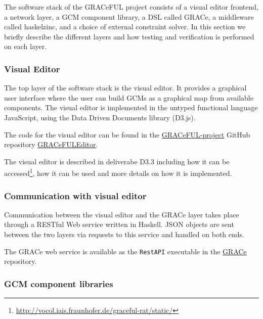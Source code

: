 The software stack of the GRACeFUL project consists of
%
a visual editor frontend,
%
a network layer,
%
a GCM component library,
%
a DSL called GRACe,
%
a middleware called haskelzinc, and
%
a choice of external constraint solver.
%
In this section we briefly describe the different layers and how testing and
verification is performed on each layer.

\subsubsection*{Visual Editor}

The top layer of the software stack is the visual editor.
%
It provides a graphical user interface where the user can build GCMs
as a graphical map from available components.
%
The visual editor is implemented in the untyped functional language
JavaScript, using the Data Driven Documents library (D3.js).
%

The code for the visual editor can be found in the
\href{https://github.com/GRACeFUL-project}{GRACeFUL-project} GitHub
repository
\href{https://github.com/GRACeFUL-project/GRACeFULEditor}{GRACeFULEditor}.


The visual editor is described in deliverabe D3.3 including how it can
be
accessed\footnote{\url{http://vocol.iais.fraunhofer.de/graceful-rat/static/}},
how it can be used and more details on how it is implemented.

\subsubsection*{Communication with visual editor}

Communication between the visual editor and the GRACe layer takes
place through a RESTful Web service written in Haskell.
%
JSON objects are sent between the two layers via requests to this
service and handled on both ends.

The GRACe web service is available as the \texttt{RestAPI} executable in the
\href{https://github.com/GRACeFUL-project/GRACe}{GRACe} repository.

\subsubsection*{GCM component libraries}

